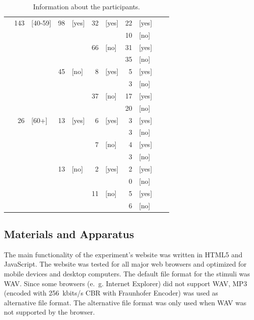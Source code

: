 \begin{table}[htb]
\begin{tabular*}{0.45\textwidth}{c r@{ }l r@{ }l r@{ }l r@{ }l r@{ }l}
     \cline{2-9} \rule{0pt}{10pt}
     & 143 & [40-59] & 98 & [yes] & 32  & [yes] & 22   & [yes] \\
     &     &         &	  &       &     &       & 10   & [no]  \\
     &     &   		 &    &       & 66  & [no]  & 31   & [yes] \\
     &     &         &	  &       &     &       & 35   & [no]  \\
     &     &   		 & 45 & [no]  & 8   & [yes] & 5    & [yes] \\
     &     &         &	  &       &     &       & 3    & [no]  \\
     &     &   		 &    &       & 37  & [no]  & 17   & [yes] \\
     &     &         &	  &       &     &       & 20   & [no]  \\
     \cline{2-9} \rule{0pt}{10pt}
     & 26  & [60+]   & 13 & [yes] & 6   & [yes] & 3    & [yes] \\
     &     &         &	  &       &     &       & 3    & [no]  \\
     &     &   		 &    &       & 7   & [no]  & 4    & [yes] \\
     &     &         &	  &       &     &       & 3    & [no]  \\
     &     &   		 & 13 & [no]  & 2   & [yes] & 2    & [yes] \\
     &     &         &	  &       &     &       & 0    & [no]  \\
     &     &   		 &    &       & 11  & [no]  & 5    & [yes] \\
     &     &         &	  &       &     &       & 6    & [no]  \\
\bottomrule[1.5pt]
\end{tabular*}
\caption{Information about the participants.}
\renewcommand{\arraystretch}{1}
\label{table:info_participants}
\end{table}

\subsection{Materials and Apparatus}\label{sec:materials}
The main functionality of the experiment's website was written in HTML5 and JavaScript. The website was tested for all major web browsers and optimized for mobile devices and desktop computers. The default file format for the stimuli was WAV. Since some browsers (e.~g. Internet Explorer) did not support WAV, MP3 (encoded with \SI{256}{kbits/s} CBR with Fraunhofer Encoder) was used as alternative file format. The alternative file format was only used when WAV was not supported by the browser.

